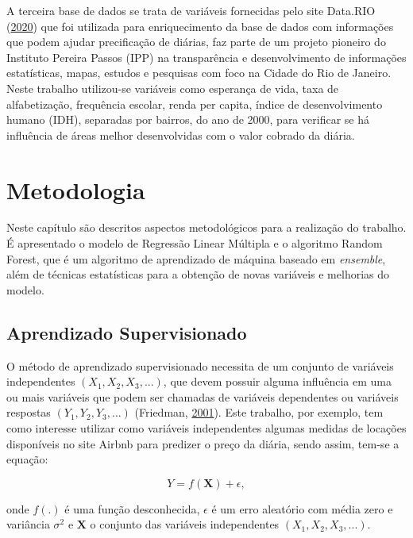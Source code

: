 \documentclass[
	12pt,				%
	a4paper,		%
	oneside,    %
	chapter=TITLE,		   %
	section=TITLE,		   %
	subsection=TITLE,	   %
	subsubsection=TITLE, %
	english,			%
	french,				%
	spanish,			%
	brazil,				%
]{abntex2}
\begin{document}
A terceira base de dados se trata de variáveis fornecidas pelo site
Data.RIO (\protect\hyperlink{ref-datario}{2020}) que foi utilizada para
enriquecimento da base de dados com informações que podem ajudar
precificação de diárias, faz parte de um projeto pioneiro do Instituto
Pereira Passos (IPP) na transparência e desenvolvimento de informações
estatísticas, mapas, estudos e pesquisas com foco na Cidade do Rio de
Janeiro. Neste trabalho utilizou-se variáveis como esperança de vida,
taxa de alfabetização, frequência escolar, renda per capita, índice de
desenvolvimento humano (IDH), separadas por bairros, do ano de 2000,
para verificar se há influência de áreas melhor desenvolvidas com o
valor cobrado da diária.

\hypertarget{metodologia}{%
\chapter{Metodologia}\label{metodologia}}

Neste capítulo são descritos aspectos metodológicos para a realização do
trabalho. É apresentado o modelo de Regressão Linear Múltipla e o
algoritmo Random Forest, que é um algoritmo de aprendizado de máquina
baseado em \emph{ensemble}, além de técnicas estatísticas para a
obtenção de novas variáveis e melhorias do modelo.

\hypertarget{aprendizado-supervisionado}{%
\section{Aprendizado Supervisionado}\label{aprendizado-supervisionado}}

O método de aprendizado supervisionado necessita de um conjunto de
variáveis independentes \((X_1, X_2, X_3, ...)\), que devem possuir
alguma influência em uma ou mais variáveis que podem ser chamadas de
variáveis dependentes ou variáveis respostas \((Y_1,Y_2,Y_3,...)\)
(Friedman, \protect\hyperlink{ref-friedman2001elements}{2001}). Este
trabalho, por exemplo, tem como interesse utilizar como variáveis
independentes algumas medidas de locações disponíveis no site Airbnb
para predizer o preço da diária, sendo assim, tem-se a equação:

\[
Y = f(\boldsymbol{X}) + \epsilon,
\]

\noindent onde \(f(.)\) é uma função desconhecida, \(\epsilon\) é um
erro aleatório com média zero e variância \(\sigma^2\) e
\(\boldsymbol{X}\) o conjunto das variáveis independentes
\((X_1, X_2, X_3, ...)\).
\end{document}
